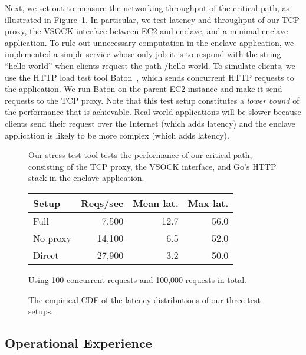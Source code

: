 Next, we set out to measure the networking throughput of the critical path, as illustrated in Figure~\ref{fig:stress-test}.  In particular, we test latency and throughput of our TCP proxy, the VSOCK interface between EC2 and enclave, and a minimal enclave application.  To rule out unnecessary computation in the enclave application, we implemented a simple service whose only job it is to respond with the string ``hello world'' when clients request the path /hello-world.  To simulate clients, we use the HTTP load test tool Baton~\cite{baton}, which sends concurrent HTTP requests to the application.  We run Baton on the parent EC2 instance and make it send requests to the TCP proxy.  Note that this test setup constitutes a \emph{lower bound} of the performance that is achievable.  Real-world applications will be slower because clients send their request over the Internet (which adds latency) and the enclave application is likely to be more complex (which adds latency).

\begin{figure}[t]
    \centering
    
    \label{fig:stress-test}
    \caption{Our stress test tool tests the performance of our critical path, consisting of the TCP proxy, the VSOCK interface, and Go's HTTP stack in the enclave application.}
\end{figure}

\begin{figure}[t]
    \centering
    \begin{tabular}{l r r r}
    \toprule
    Setup & Reqs/sec & Mean lat. & Max lat. \\
    \midrule
    Full & ~7,500 & 12.7 & 56.0 \\
    No proxy & 14,100 & 6.5 & 52.0 \\
    Direct & ~27,900 & 3.2 & 50.0 \\
    \bottomrule
    \end{tabular}
    \caption{Using 100 concurrent requests and 100,000 requests in total.}
    \label{tab:my_label}
\end{figure}


\begin{figure}[t]
    \centering
    
    \label{fig:latency-cdf}
    \caption{The empirical CDF of the latency distributions of our three test setups.}
\end{figure}

\subsection{Operational Experience}
\label{sec:operations}

